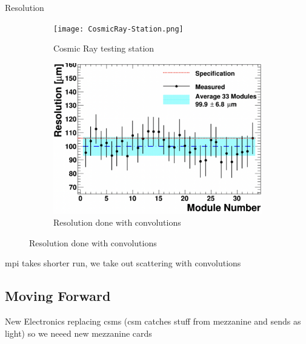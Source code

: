 		\begin{frame}{Resolution \ph}
			\begin{figure}
				\centering	
				\begin{subfigure}[c]{0.4\pdfpagewidth}
					\centering
					\texttt{[image: CosmicRay-Station.png]}
					\caption{Cosmic Ray testing station}
				\end{subfigure}
				\hfill
				\begin{subfigure}[c]{0.4\pdfpagewidth}
					\includegraphics[width=0.4\pdfpagewidth]{ChamberResolution.png}
					\caption{Resolution done with convolutions}
					\label{fig:ChamberResolution}
				\end{subfigure}
			\end{figure}
			mpi takes shorter run, we take out scattering with convolutions
		\end{frame}



	\subsection{Moving Forward}

		\begin{frame}{New Electronics}
			replacing csms (csm catches stuff from mezzanine and sends as light)
			so we neeed new mezzanine cards 
		\end{frame}




